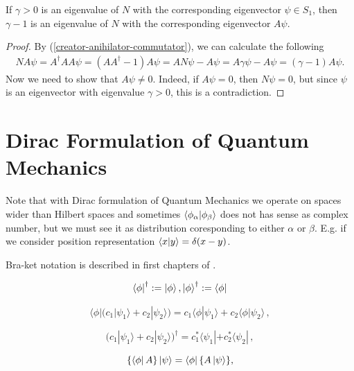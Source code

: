 \documentclass[main.tex]{subfiles}
\begin{document}
\begin{fact}
If $\gamma > 0$ is an eigenvalue of $N$ with the corresponding eigenvector $\psi\in S_1$, then $\gamma - 1$ is an eigenvalue of $N$ with the corresponding eigenvector $A\psi$.
\end{fact}
\begin{proof}
By (\ref{creator-anihilator-commutator}), we can calculate the following
\begin{multline}
N A\psi = A^\dag A A \psi = (AA^\dag - 1)A\psi = AN\psi - A\psi = A\gamma\psi - A\psi = (\gamma - 1)A\psi.
\end{multline}
Now we need to show that $A\psi \not= 0$. Indeed, if $A\psi=0$, then $N\psi = 0$, but since $\psi$ is an eigenvector with eigenvalue $\gamma > 0$, this is a contradiction.
\end{proof}
\section{Dirac Formulation of Quantum Mechanics}

\begin{note}
\label{dirac-note}
Note that with Dirac formulation of Quantum Mechanics we operate on spaces wider than Hilbert spaces and sometimes $\bra{\phi_\alpha}\ket{\phi_\beta}$ does not has sense as complex number, but we must see it as distribution coresponding to either $\alpha$ or $\beta$. E.g. if we consider position representation $\bra{x}\ket{y} = \delta(x - y)$.
\end{note}

Bra-ket notation is described in first chapters of \cite{dirac1981}.

\begin{equation}
\bra{\phi}^\dagger := \ket{\phi}, \ket{\phi}^\dagger := \bra{\phi}
\end{equation}

\begin{equation}
\langle\phi| \bigl( c_1|\psi_1\rangle + c_2|\psi_2\rangle \bigr) = c_1\langle\phi|\psi_1\rangle + c_2\langle\phi|\psi_2\rangle \,,
\end{equation}



\begin{equation}
\bigl(c_1|\psi_1\rangle + c_2|\psi_2\rangle\bigr)^\dagger = c_1^* \langle\psi_1| + c_2^* \langle\psi_2| \,,
\end{equation}

\begin{equation}
\{\bra{\phi}A\}\ket{\psi} = \bra{\phi}\{A\ket{\psi}\},
\end{equation}
\end{document}
